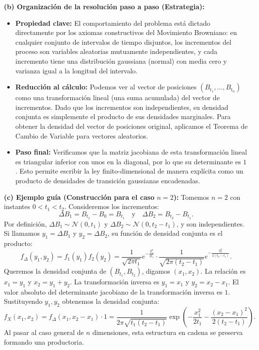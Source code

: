 \documentclass[11pt, letterpaper]{article}
\begin{document}
\begin{solucion}
    \textbf{(b) Organización de la resolución paso a paso (Estrategia):}
    \begin{itemize}
        \item[(i)] \textbf{Propiedad clave:} El comportamiento del problema está dictado directamente por los axiomas constructivos del Movimiento Browniano: en cualquier conjunto de intervalos de tiempo disjuntos, los incrementos del proceso son variables aleatorias mutuamente independientes, y cada incremento tiene una distribución gaussiana (normal) con media cero y varianza igual a la longitud del intervalo.
        \item[(ii)] \textbf{Reducción al cálculo:} Podemos ver al vector de posiciones $(B_{t_1}, \dots, B_{t_n})$ como una transformación lineal (una suma acumulada) del vector de incrementos. Dado que los incrementos son independientes, su densidad conjunta es simplemente el producto de sus densidades marginales. Para obtener la densidad del vector de posiciones original, aplicamos el Teorema de Cambio de Variable para vectores aleatorios.
        \item[(iii)] \textbf{Paso final:} Verificamos que la matriz jacobiana de esta transformación lineal es triangular inferior con unos en la diagonal, por lo que su determinante es $1$. Esto permite escribir la ley finito-dimensional de manera explícita como un producto de densidades de transición gaussianas encadenadas.
    \end{itemize}

    \vspace{3mm}
    \textbf{(c) Ejemplo guía (Construcción para el caso $n=2$):}
    Tomemos $n=2$ con instantes $0 < t_1 < t_2$. Consideremos los incrementos:
    \[ \Delta B_1 = B_{t_1} - B_0 = B_{t_1} \quad \text{y} \quad \Delta B_2 = B_{t_2} - B_{t_1}. \]
    Por definición, $\Delta B_1 \sim \mathcal{N}(0, t_1)$ y $\Delta B_2 \sim \mathcal{N}(0, t_2 - t_1)$, y son independientes.
    Si llamamos $y_1 = \Delta B_1$ y $y_2 = \Delta B_2$, su función de densidad conjunta es el producto:
    \[ f_{\Delta}(y_1, y_2) = f_1(y_1)f_2(y_2) = \frac{1}{\sqrt{2\pi t_1}} e^{-\frac{y_1^2}{2t_1}} \cdot \frac{1}{\sqrt{2\pi (t_2-t_1)}} e^{-\frac{y_2^2}{2(t_2-t_1)}}. \]
    Queremos la densidad conjunta de $(B_{t_1}, B_{t_2})$, digamos $(x_1, x_2)$. La relación es $x_1 = y_1$ y $x_2 = y_1 + y_2$. La transformación inversa es $y_1 = x_1$ y $y_2 = x_2 - x_1$.
    El valor absoluto del determinante jacobiano de la transformación inversa es $1$.
    Sustituyendo $y_1, y_2$ obtenemos la densidad conjunta:
    \[ f_{X}(x_1, x_2) = f_{\Delta}(x_1, x_2 - x_1) \cdot 1 = \frac{1}{2\pi \sqrt{t_1(t_2-t_1)}} \exp\left( -\frac{x_1^2}{2t_1} - \frac{(x_2-x_1)^2}{2(t_2-t_1)} \right). \]
    Al pasar al caso general de $n$ dimensiones, esta estructura en cadena se preserva formando una productoria.


\end{solucion}
\end{document}
